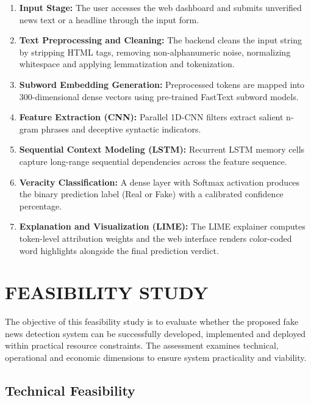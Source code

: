 \documentclass[12pt,a4paper,oneside]{report}
\begin{document}
\begin{enumerate}[label=\arabic*., leftmargin=*, itemsep=2pt]
  \item \textbf{Input Stage:} The user accesses the web dashboard and submits unverified news
        text or a headline through the input form.
  \item \textbf{Text Preprocessing and Cleaning:} The backend cleans the input string by
        stripping HTML tags, removing non-alphanumeric noise, normalizing whitespace and
        applying lemmatization and tokenization.
  \item \textbf{Subword Embedding Generation:} Preprocessed tokens are mapped into 300-dimensional
        dense vectors using pre-trained FastText subword models.
  \item \textbf{Feature Extraction (CNN):} Parallel 1D-CNN filters extract salient n-gram phrases
        and deceptive syntactic indicators.
  \item \textbf{Sequential Context Modeling (LSTM):} Recurrent LSTM memory cells capture
        long-range sequential dependencies across the feature sequence.
  \item \textbf{Veracity Classification:} A dense layer with Softmax activation produces the
        binary prediction label (Real or Fake) with a calibrated confidence percentage.
  \item \textbf{Explanation and Visualization (LIME):} The LIME explainer computes token-level
        attribution weights and the web interface renders color-coded word highlights alongside
        the final prediction verdict.
\end{enumerate}

\chapter{FEASIBILITY STUDY}

The objective of this feasibility study is to evaluate whether the proposed fake news detection
system can be successfully developed, implemented and deployed within practical resource
constraints. The assessment examines technical, operational and economic dimensions to ensure
system practicality and viability.

\section{Technical Feasibility}
\end{document}
